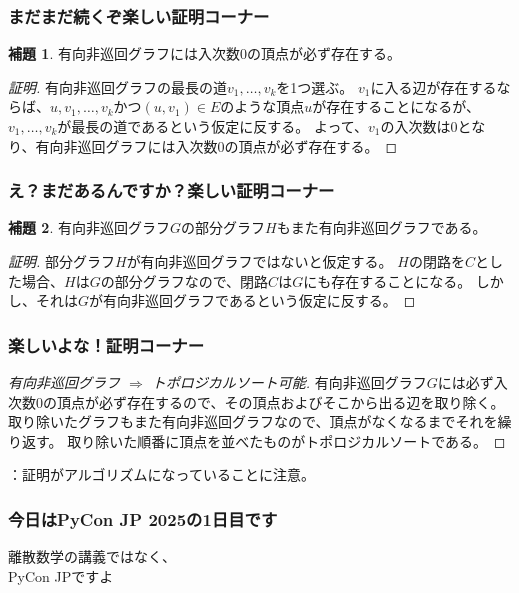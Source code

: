 \documentclass[aspectratio=169,dvipdfmx,12pt,notheorems]{beamer}
\theoremstyle{definition}
\newtheorem{lemma}{補題}
\begin{document}
\begin{frame}\frametitle{まだまだ続くぞ楽しい証明コーナー}

\begin{lemma}
有向非巡回グラフには入次数0の頂点が必ず存在する。
\end{lemma}

\begin{proof}[証明]
有向非巡回グラフの最長の道$v_{1}, \dots, v_{k}$を1つ選ぶ。
$v_{1}$に入る辺が存在するならば、$u, v_{1}, \dots, v_{k}$かつ$(u, v_{1}) \in E$のような頂点$u$が存在することになるが、$v_{1}, \dots, v_{k}$が最長の道であるという仮定に反する。
よって、$v_{1}$の入次数は0となり、有向非巡回グラフには入次数0の頂点が必ず存在する。
\end{proof}

\end{frame}

\begin{frame}\frametitle{え？まだあるんですか？楽しい証明コーナー}

\begin{lemma}
有向非巡回グラフ$G$の部分グラフ$H$もまた有向非巡回グラフである。
\end{lemma}

\begin{proof}[証明]
部分グラフ$H$が有向非巡回グラフではないと仮定する。
$H$の閉路を$C$とした場合、$H$は$G$の部分グラフなので、閉路$C$は$G$にも存在することになる。
しかし、それは$G$が有向非巡回グラフであるという仮定に反する。
\end{proof}

\end{frame}

\begin{frame}\frametitle{楽しいよな！証明コーナー}

\begin{proof}[有向非巡回グラフ $\Rightarrow$ トポロジカルソート可能]
有向非巡回グラフ$G$には必ず入次数0の頂点が必ず存在するので、その頂点およびそこから出る辺を取り除く。
取り除いたグラフもまた有向非巡回グラフなので、頂点がなくなるまでそれを繰り返す。
取り除いた順番に頂点を並べたものがトポロジカルソートである。
\end{proof}
：証明がアルゴリズムになっていることに注意。

\end{frame}

\begin{frame}\frametitle{今日はPyCon JP 2025の1日目です}

\begin{center}
\Huge{離散数学の講義ではなく、 \\ PyCon JPですよ}
\end{center}

\end{frame}
\end{document}
